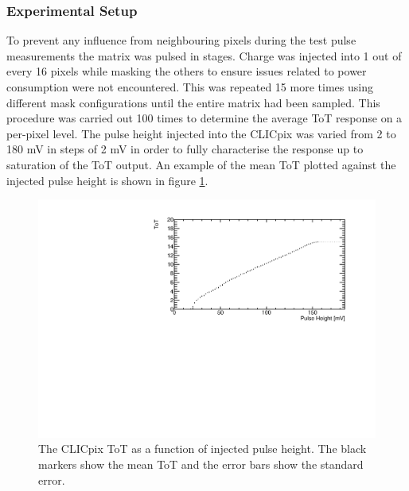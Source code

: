 
\subsubsection{Experimental Setup}

To prevent any influence from neighbouring pixels during the test pulse measurements the matrix was pulsed in stages.  Charge was injected into 1 out of every 16 pixels while masking the others to ensure issues related to power consumption were not encountered.  This was repeated 15 more times using different mask configurations until the entire matrix had been sampled.  This procedure was carried out 100 times to determine the average ToT response on a per-pixel level.  The pulse height injected into the CLICpix was varied from 2 to 180 mV in steps of 2 mV in order to fully characterise the response up to saturation of the ToT output.  An example of the mean ToT plotted against the injected pulse height is shown in figure \ref{fig:testpulseexamplenofit}.  

\begin{figure}[h!]
\centering
\includegraphics[width=1.0\textwidth]{CLICdpVertex/Plots/TestPulseCalibration/Fits/Set9/ToT_PulseHeight_Set_9_ChipID_001ec0db94b1_Pixel_x0_y0_NoFit.pdf}
\caption[The CLICpix ToT as a function of injected pulse height.  The black markers show the mean ToT and the error bars show the standard error.]{The CLICpix ToT as a function of injected pulse height.  The black markers show the mean ToT and the error bars show the standard error.}
\label{fig:testpulseexamplenofit}
\end{figure}

